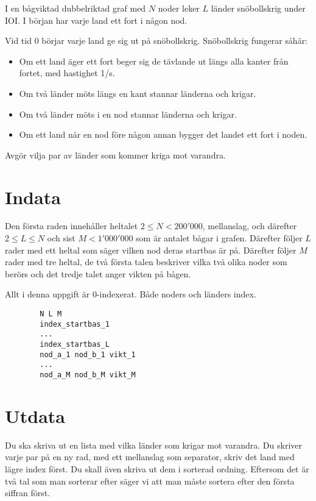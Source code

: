 
I en bågviktad dubbelriktad graf med $N$ noder leker $L$ länder snöbollskrig under IOI. I
början har varje land ett fort i någon nod.

Vid tid $0$ börjar varje land ge sig ut på snöbollskrig. Snöbollskrig fungerar såhär:

\begin{itemize}
\item Om ett land äger ett fort beger sig de tävlande ut längs alla kanter från fortet, med hastighet 1/s.
\item Om två länder möts längs en kant stannar länderna och krigar.
\item Om två länder möts i en nod stannar länderna och krigar.
\item Om ett land når en nod före någon annan bygger det landet ett fort i noden.
\end{itemize}

Avgör vilja par av länder som kommer kriga mot varandra.

\section*{Indata}

Den första raden innehåller heltalet $2 \le N < 200'000$, mellanslag, och
därefter $2 \le L \le N$ och sist $M < 1'000'000$ som är antalet bågar i
grafen. Därefter följer $L$ rader med ett heltal som säger vilken nod deras
startbas är på. Därefter följer $M$ rader med tre heltal, de två första talen
beskriver vilka två olika noder som berörs och det tredje talet anger vikten på
bågen.

Allt i denna uppgift är 0-indexerat. Både noders och länders index.

\begin{lstlisting}
        N L M
        index_startbas_1
        ...
        index_startbas_L
        nod_a_1 nod_b_1 vikt_1
        ...
        nod_a_M nod_b_M vikt_M
\end{lstlisting}

\section*{Utdata}

Du ska skriva ut en lista med vilka länder som krigar mot varandra. Du skriver
varje par på en ny rad, med ett mellanslag som separator, skriv det land med
lägre index först. Du skall även skriva ut dem i sorterad ordning. Eftersom det
är två tal som man sorterar efter säger vi att man måste sortera efter den
första siffran först. 

